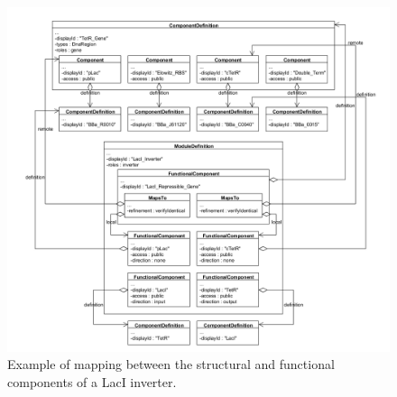 
\begin{figure}[ht]
\begin{center}
\includegraphics[width=\textwidth]{example_uml/toggle_5}
\caption[]{Example of mapping between the structural and functional components of a LacI inverter.}
\label{uml:ex_comp_mapping}
\end{center}
\end{figure}
